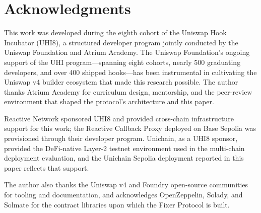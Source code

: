 \documentclass[conference]{IEEEtran}
\begin{document}
\section*{Acknowledgments}
This work was developed during the eighth cohort of the Uniswap Hook Incubator (UHI8), a structured developer program jointly conducted by the Uniswap Foundation and Atrium Academy. The Uniswap Foundation's ongoing support of the UHI program---spanning eight cohorts, nearly 500 graduating developers, and over 400 shipped hooks---has been instrumental in cultivating the Uniswap v4 builder ecosystem that made this research possible. The author thanks Atrium Academy for curriculum design, mentorship, and the peer-review environment that shaped the protocol's architecture and this paper.

Reactive Network sponsored UHI8 and provided cross-chain infrastructure support for this work; the Reactive Callback Proxy deployed on Base Sepolia was provisioned through their developer program. Unichain, as a UHI8 sponsor, provided the DeFi-native Layer-2 testnet environment used in the multi-chain deployment evaluation, and the Unichain Sepolia deployment reported in this paper reflects that support.

The author also thanks the Uniswap v4 and Foundry open-source communities for tooling and documentation, and acknowledges OpenZeppelin, Solady, and Solmate for the contract libraries upon which the Fixer Protocol is built.
\end{document}
